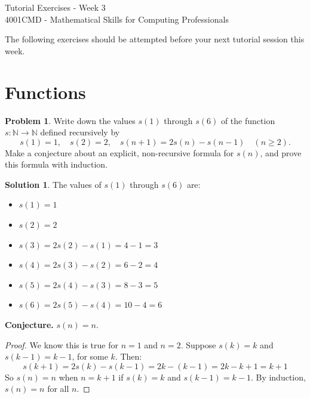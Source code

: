 \documentclass{article}
\numberwithin{equation}{section}
\theoremstyle{plain}
\theoremstyle{definition}
\newtheorem{problem}{Problem}
\newtheorem*{solution*}{Solution}
\newcommand{\N}{\mathbb N}
\begin{document}
\begin{center}
\Large{Tutorial Exercises - Week 3} \\
\vspace{3mm}
\large{4001CMD - Mathematical Skills for Computing Professionals} \\
\vspace{5mm}
\end{center}


The following exercises should be attempted before your next tutorial session this week. 

\section*{Functions}

\begin{problem}
	Write down the values $s(1)$ through $s(6)$ of the function $s : \N \to \N$ defined recursively by 
	\[
	s(1) = 1, \quad s(2) = 2, \quad s(n+1) = 2s(n) - s(n-1) \quad (n \geq 2).
	\]
	Make a conjecture about an explicit, non-recursive formula for $s(n)$, and prove this formula with induction. 
\end{problem}

\begin{solution*}
	The values of $s(1)$ through $s(6)$ are:
	\begin{itemize}
		\item $s(1) = 1$
		\item $s(2) = 2$
		\item $s(3) = 2s(2) - s(1) = 4 - 1 = 3$
		\item $s(4) = 2s(3) - s(2) = 6 - 2 = 4$
		\item $s(5) = 2s(4) - s(3) = 8 - 3 = 5$
		\item $s(6) = 2s(5) - s(4) = 10 - 4 = 6$
	\end{itemize}
	\textbf{Conjecture.} $\boxed{s(n) = n}$.
	\begin{proof}
		We know this is true for $n=1$ and $n=2$. Suppose $s(k) = k$ and $s(k-1) = k-1$, for some $k$. Then: 
		\[
		s(k+1) = 2s(k) - s(k-1) = 2k - (k-1) = 2k - k + 1 = k + 1
		\]
		So $s(n)= n$ when $n=k+1$ if $s(k) = k$ and $s(k-1) = k-1$. By induction, $s(n) = n$ for all $n$. 
	\end{proof}
\end{solution*}
\end{document}
